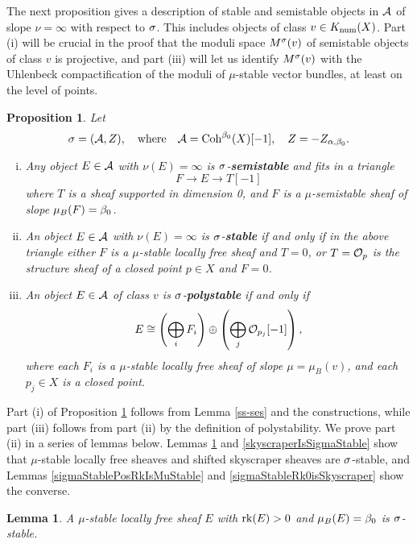 \documentclass[letterpaper,11pt]{amsart}%
\newtheorem{lem}[thm]{Lemma}
\newtheorem{prop}[thm]{Proposition}
\theoremstyle{remark}
\begin{document}
The next proposition gives a description of stable and semistable objects in $\mathcal{A}$ of slope $\nu = \infty$ with respect to $\sigma$. This includes objects of class $v \in K_{\mathrm{num}}(X)$. Part (i) will be crucial in the proof that the moduli space $M^\sigma(v)$ of semistable objects of class $v$ is projective, and part (iii) will let us identify $M^\sigma(v)$ with the Uhlenbeck compactification of the moduli of $\mu$-stable vector bundles, at least on the level of points.
\begin{prop}\label{ss-object-vertical-classification}
    Let 
    \[ \sigma = (\mathcal{A}, Z), \quad \mathrm{where} \quad \mathcal{A} = \mathrm{Coh}^{\beta_0}(X)[-1], \quad Z = -Z_{\alpha,\beta_0}. \]
    \begin{enumerate}[(i)]
        \item Any object $E \in \mathcal{A}$ with $\nu(E) = \infty$ is $\sigma$-{\bf semistable} and fits in a triangle
        \[ F \to E \to T[-1] \]
        where $T$ is a sheaf supported in dimension 0, and $F$ is a $\mu$-semistable sheaf of slope $\mu_B(F) = \beta_0$. 
        \item An object $E \in \mathcal{A}$ with $\nu(E) = \infty$ is $\sigma$-{\bf stable} if and only if in the above triangle either $F$ is a $\mu$-stable locally free sheaf and $T = 0$, or $T = \mathcal{O}_p$ is the structure sheaf of a closed point $p \in X$ and $F = 0$.
        \item An object $E \in \mathcal{A}$ of class $v$ is $\sigma$-{\bf polystable} if and only if
        \[ E \cong \left(\bigoplus_i F_i\right) \oplus \left(\bigoplus_j \mathcal{O}_{p_j}[-1]\right), \]
        where each $F_i$ is a $\mu$-stable locally free sheaf of slope $\mu = \mu_B(v)$, and each $p_j \in X$ is a closed point.
    \end{enumerate}
\end{prop}
Part (i) of Proposition \ref{ss-object-vertical-classification} follows from Lemma \ref{ss-ses} and the constructions, while part (iii) follows from part (ii) by the definition of polystability. We prove part (ii)
in a series of lemmas below. Lemmas \ref{muStableLfIsSigmaStable} and \ref{skyscraperIsSigmaStable} show that $\mu$-stable locally free sheaves and shifted skyscraper sheaves are $\sigma$-stable, and Lemmas \ref{sigmaStablePosRkIsMuStable} and \ref{sigmaStableRk0isSkyscraper} show the converse.
\begin{lem}\label{muStableLfIsSigmaStable}
    A $\mu$-stable locally free sheaf $E$ with $\operatorname{\mathrm{rk}}(E) > 0$ and $\mu_B(E) = \beta_0$ is $\sigma$-stable.
\end{lem}
\end{document}
